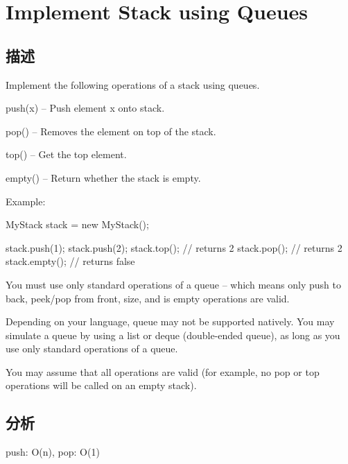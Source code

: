 \section{Implement Stack using Queues}
\label{sec:implement-stack-using-queues}

\subsection{描述}
Implement the following operations of a stack using queues.

\begindot
\item push(x) -- Push element x onto stack.
\item pop() -- Removes the element on top of the stack.
\item top() -- Get the top element.
\item empty() -- Return whether the stack is empty.
\myenddot

Example:
\begin{Code}
MyStack stack = new MyStack();

stack.push(1);
stack.push(2);  
stack.top();   // returns 2
stack.pop();   // returns 2
stack.empty(); // returns false
\end{Code}

\begindot
\item You must use only standard operations of a queue -- which means only push to back, peek/pop from front, size, and is empty operations are valid.
\item Depending on your language, queue may not be supported natively. You may simulate a queue by using a list or deque (double-ended queue), as long as you use only standard operations of a queue.
\item You may assume that all operations are valid (for example, no pop or top operations will be called on an empty stack).
\myenddot

\subsection{分析}
push: O(n), pop: O(1)


